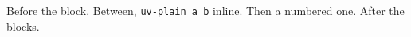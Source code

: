 \documentclass{article}
\begin{document}
Before the block.
Between, \Verb|uv-plain a_b| inline.
Then a numbered one.
After the blocks.
\end{document}

